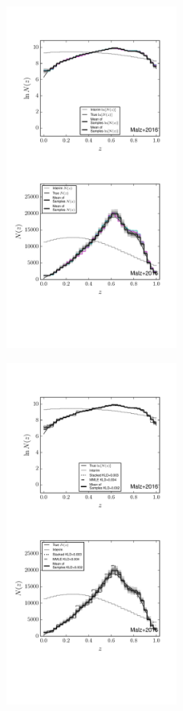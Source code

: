 \documentclass[preprint]{aastex}
\begin{document}
\begin{figure}
\includegraphics[width=0.5\textwidth]{figs/uint/samps.pdf}
\caption{}
\label{fig:intu-samp}
\end{figure}

\begin{figure}
\includegraphics[width=0.5\textwidth]{figs/uint/comps.pdf}
\caption{}
\label{fig:intu-comp}
\end{figure}
\end{document}
